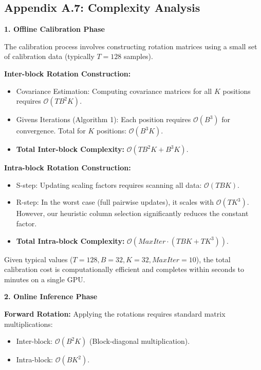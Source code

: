 \subsection*{Appendix A.7: Complexity Analysis}
\label{app:complexity_analysis}

\textbf{1. Offline Calibration Phase}

The calibration process involves constructing rotation matrices using a small set of calibration data (typically $T=128$ samples).

\textbf{Inter-block Rotation Construction:}
\begin{itemize}
    \item Covariance Estimation: Computing covariance matrices for all $K$ positions requires $\mathcal{O}(T B^2 K)$.
    \item Givens Iterations (Algorithm 1): Each position requires $\mathcal{O}(B^3)$ for convergence. Total for $K$ positions: $\mathcal{O}(B^3 K)$.
    \item \textbf{Total Inter-block Complexity:} $\mathcal{O}(T B^2 K + B^3 K)$.
\end{itemize}

\textbf{Intra-block Rotation Construction:}
\begin{itemize}
    \item S-step: Updating scaling factors requires scanning all data: $\mathcal{O}(TBK)$.
    \item R-step: In the worst case (full pairwise updates), it scales with $\mathcal{O}(TK^3)$. However, our heuristic column selection significantly reduces the constant factor.
    \item \textbf{Total Intra-block Complexity:} $\mathcal{O}(MaxIter \cdot (TBK + TK^3))$.
\end{itemize}

Given typical values ($T=128, B=32, K=32, MaxIter=10$), the total calibration cost is computationally efficient and completes within seconds to minutes on a single GPU.

\textbf{2. Online Inference Phase}

\textbf{Forward Rotation:}
Applying the rotations requires standard matrix multiplications:
\begin{itemize}
    \item Inter-block: $\mathcal{O}(B^2 K)$ (Block-diagonal multiplication).
    \item Intra-block: $\mathcal{O}(B K^2)$.
\end{itemize}

